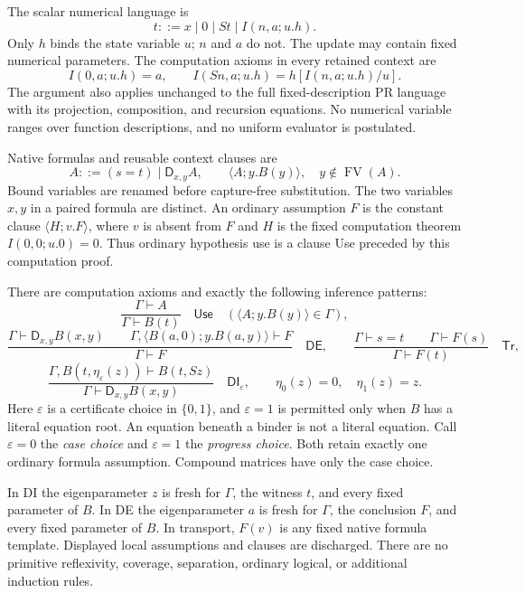 \documentclass[11pt]{article}
\theoremstyle{definition}
\begin{document}
The scalar numerical language is
\[
 t::=x\mid0\mid St\mid I(n,a;u.h).
\]
Only $h$ binds the state variable $u$; $n$ and $a$ do not.
The update may contain fixed numerical parameters. The computation
axioms in every retained context are
\[
 I(0,a;u.h)=a,\qquad
 I(Sn,a;u.h)=h[I(n,a;u.h)/u].
 \tag{I0, IS}\label{eq:choice-computations}
\]
The argument also applies unchanged to the full fixed-description PR
language with its projection, composition, and recursion equations.
No numerical variable ranges over function descriptions, and no uniform
evaluator is postulated.

Native formulas and reusable context clauses are
\[
 A::=(s=t)\mid\mathsf D_{x,y}A,\qquad
 \langle A;y.B(y)\rangle,\quad y\notin\operatorname{FV}(A).
\]
Bound variables are renamed before capture-free substitution.
The two variables $x,y$ in a paired formula are distinct.
An ordinary assumption $F$ is the constant clause
$\langle H;v.F\rangle$, where $v$ is absent from $F$ and $H$ is the
fixed computation theorem $I(0,0;u.0)=0$. Thus ordinary hypothesis
use is a clause Use preceded by this computation proof.

There are computation axioms and exactly the following inference
patterns:
\[
\frac{\Gamma\vdash A}{\Gamma\vdash B(t)}
\quad\mathsf{Use}
\quad(\langle A;y.B(y)\rangle\in\Gamma),
\]
\[
\frac{\Gamma\vdash\mathsf D_{x,y}B(x,y)\qquad
      \Gamma,\langle B(a,0);y.B(a,y)\rangle\vdash F}
     {\Gamma\vdash F}
\quad\mathsf{DE},
\qquad
\frac{\Gamma\vdash s=t\qquad\Gamma\vdash F(s)}
     {\Gamma\vdash F(t)}
\quad\mathsf{Tr},
\]
\[
\frac{\Gamma,B(t,\eta_\varepsilon(z))\vdash B(t,Sz)}
     {\Gamma\vdash\mathsf D_{x,y}B(x,y)}
\quad\mathsf{DI}_{\varepsilon},
\qquad
\eta_0(z)=0,\quad\eta_1(z)=z.
\tag{Choice DI}\label{eq:choice-di}
\]
Here $\varepsilon$ is a certificate choice in $\{0,1\}$, and
$\varepsilon=1$ is permitted only when $B$ has a literal equation
root. An equation beneath a binder is not a literal equation.
Call $\varepsilon=0$ the \emph{case choice} and $\varepsilon=1$
the \emph{progress choice}. Both retain exactly one ordinary
formula assumption. Compound matrices have only the case choice.

In DI the eigenparameter $z$ is fresh for $\Gamma$, the witness
$t$, and every fixed parameter of $B$. In DE the eigenparameter
$a$ is fresh for $\Gamma$, the conclusion $F$, and every fixed
parameter of $B$. In transport, $F(v)$ is any fixed native
formula template. Displayed local assumptions and clauses are
discharged. There are no primitive reflexivity, coverage,
separation, ordinary logical, or additional induction rules.
\end{document}
